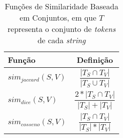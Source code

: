 \begin{table}[H]
\centering
 \caption{Funções de Similaridade Baseada em Conjuntos, em que $T$ representa o conjunto de \textit{tokens} de cada \textit{string}}
  \label{tabelaFuncoesSimilaridade}
    \begin{tabular}{|l|c|} 
    \hline Função & Definição \\
    \hline $sim_{jaccard}(S,V)$ & $\dfrac{|T_S \cap T_V|}{|T_S \cup T_V|}$\\ 
    \hline $sim_{dice}(S,V)$ & $\dfrac{2*|T_S \cap T_V|}{|T_S| + |T_V|}$ \\ 
    \hline $sim_{cosseno}(S,V)$ & $\dfrac{|T_S \cap T_V|}{|T_S| * |T_V|}$ \\
    \hline
    \end{tabular}
\end{table}